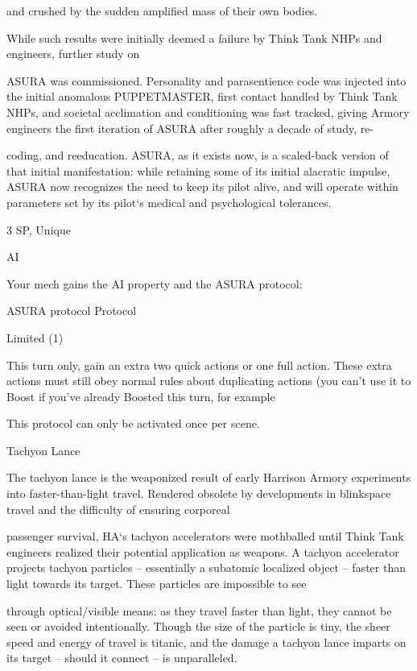 and crushed by the sudden amplified mass of their own bodies.   

While such results were initially deemed a failure by Think Tank NHPs and engineers, further study on  

ASURA was commissioned. Personality and parasentience code was injected into the initial anomalous  
PUPPETMASTER, first contact handled by Think Tank NHPs, and societal acclimation and conditioning  
was fast tracked, giving Armory engineers the first iteration of ASURA after roughly a decade of study, re- 

coding, and reeducation. ASURA, as it exists now, is a scaled-back version of that initial manifestation:  
while retaining some of its initial alacratic impulse, ASURA now recognizes the need to keep its pilot alive,  
and will operate within parameters set by its pilot‘s medical and psychological tolerances.  

3 SP, Unique
 
AI  

Your mech gains the AI property and the ASURA protocol:
 
         ASURA protocol  
	        Protocol
 
         Limited (1)
 

                                                                                                                   


         This turn only, gain an extra two quick actions or one full action. These extra actions must  
         still obey normal rules about duplicating actions (you can’t use it to Boost if you’ve  
         already Boosted this turn, for example
 
         This protocol can only be activated once per scene.
 

Tachyon Lance  

The tachyon lance is the weaponized result of early Harrison Armory experiments into faster-than-light  
travel. Rendered obsolete by developments in blinkspace travel and the difficulty of ensuring corporeal  

passenger survival, HA‘s tachyon accelerators were mothballed until Think Tank engineers realized their  
potential application as weapons. A tachyon accelerator projects tachyon particles -- essentially a  
subatomic localized object -- faster than light towards its target. These particles are impossible to see  

through optical/visible means: as they travel faster than light, they cannot be seen or avoided intentionally.  
Though the size of the particle is tiny, the sheer speed and energy of travel is titanic, and the damage a  
tachyon lance imparts on its target -- should it connect -- is unparalleled.   

